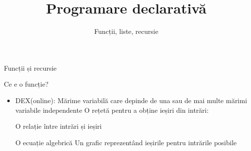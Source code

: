 \documentclass[handout,xcolor=pdftex,romanian,colorlinks]{beamer}
\title[PD---Baze]{Programare declarativă}
\subtitle{Funcții, liste, recursie}
\begin{document}
\begin{frame}
  \titlepage
\end{frame}

\begin{section}{Funcții și recursie}
\begin{frame}{Ce e o funcție?}
\begin{itemize}
\item DEX(online): Mărime variabilă care depinde de una sau de mai multe mărimi variabile independente
\vitem O rețetă pentru a obține ieșiri din intrări: 
\hfill {}

\vitem O relație între intrări și ieșiri
      \hfill {} 
      
\vitem O ecuație algebrică \hfill {}
\vitem Un grafic reprezentând ieșirile pentru intrările posibile
 \pgfplotsset{height=5cm}
\end{itemize}
\end{frame}


\end{section}
\end{document}
